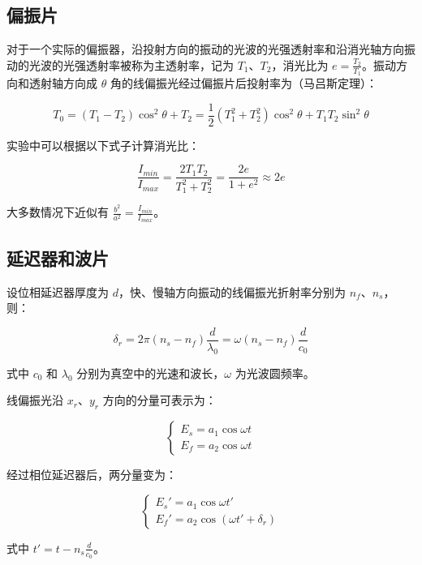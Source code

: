 \documentclass[a4paper]{article}
\begin{document}
\subsection{偏振片}

\par 对于一个实际的偏振器，沿投射方向的振动的光波的光强透射率和沿消光轴方向振动的光波的光强透射率被称为主透射率，记为 $T_1$、$T_2$，消光比为 $e=\frac{T_2}{T_1}$。振动方向和透射轴方向成 $\theta$ 角的线偏振光经过偏振片后投射率为（马吕斯定理）：

\[
    T_0=(T_1-T_2)\cos^2\theta+T_2=\frac{1}{2}(T_1^2+T_2^2)\cos^2\theta+T_1T_2\sin^2\theta
\]

\par 实验中可以根据以下式子计算消光比：

\[
    \frac{I_{min}}{I_{max}}=\frac{2T_1T_2}{T_1^2+T_2^2}=\frac{2e}{1+e^2}\approx 2e
\]

\par 大多数情况下近似有 $\frac{b^2}{a^2}=\frac{I_{min}}{I_{max}}$。

\subsection{延迟器和波片}

\par 设位相延迟器厚度为 $d$，快、慢轴方向振动的线偏振光折射率分别为 $n_f$、$n_s$，则：

\[
    \delta_r=2\pi(n_s-n_f)\frac{d}{\lambda_0}=\omega(n_s-n_f)\frac{d}{c_0}
\]

\par 式中 $c_0$ 和 $\lambda_0$ 分别为真空中的光速和波长，$\omega$ 为光波圆频率。

\par 线偏振光沿 $x_r$、$y_r$ 方向的分量可表示为：

\[
\left\{
\begin{array}{l}
    E_s=a_1 \cos\omega t \\
    E_f=a_2 \cos\omega t
\end{array}
\right.
\]

\par 经过相位延迟器后，两分量变为：

\[
\left\{
\begin{array}{l}
    E_s'=a_1 \cos\omega t' \\
    E_f'=a_2 \cos(\omega t'+\delta_r)
\end{array}
\right.
\]

\par 式中 $t'=t-n_s\frac{d}{c_0}$。
\end{document}

